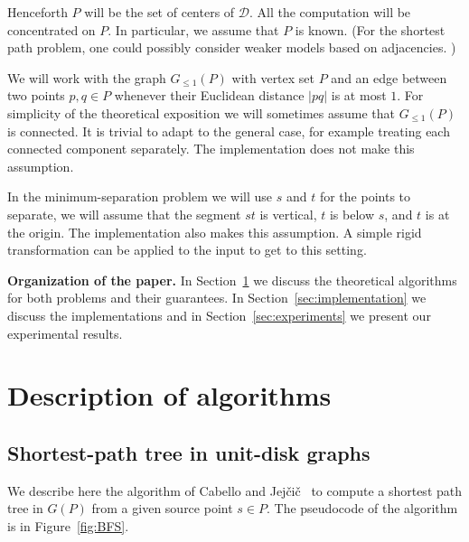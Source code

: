 \documentclass[a4paper,USenglish,numberwithinsect]{lipics}
\newcommand{\D}{\ensuremath{\mathcal{D}}}
\newcommand{\GG}{\ensuremath{G_{\le 1}}}
\let\le\leqslant
\def\myparagraph#1{\medskip\noindent\textbf{#1.}}
\begin{document}
Henceforth $P$ will be the set of centers of $\D$. 
All the computation will be concentrated on $P$. 
In particular, we assume that $P$ is known.
(For the shortest path problem, one could possibly consider weaker models based 
on adjacencies. )

We will work with the graph $\GG(P)$ with vertex set $P$ 
and an edge between two points $p,q\in P$ 
whenever their Euclidean distance $|pq|$ is at most $1$. 
For simplicity of the theoretical 
exposition we will sometimes assume that $\GG(P)$ is connected.
It is trivial to adapt to the general case, for example
treating each connected component separately.
The implementation does not make this assumption.

In the minimum-separation problem we will use $s$ and $t$
for the points to separate, we will assume that
the segment $st$ is vertical, $t$ is below $s$, and $t$ is 
at the origin. The implementation also makes
this assumption. A simple rigid transformation can be applied to
the input to get to this setting.

\myparagraph{Organization of the paper} 
In Section~\ref{sec:algorithms} we discuss the theoretical
algorithms for both problems and their guarantees.
In Section~\ref{sec:implementation} we discuss the implementations 
and in Section~\ref{sec:experiments} we present our experimental results.

\section{Description of algorithms}
\label{sec:algorithms}

\subsection{Shortest-path tree in unit-disk graphs}
\label{sec:algorithm-sptree}
We describe here the algorithm of Cabello and Jej\v{c}i\v{c}~\cite{CJ15} 
to compute a shortest path tree in $G(P)$ from a given source point $s\in P$. 
The pseudocode of the algorithm is in Figure~\ref{fig:BFS}. 
\end{document}
